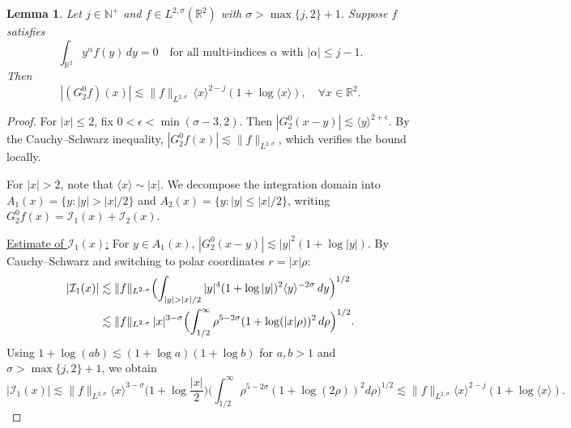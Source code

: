 \documentclass[reqno]{amsart}
\newtheorem{lemma}[theorem]{Lemma}
\numberwithin{equation}{section}
\begin{document}
\begin{lemma} \label{estimate_G_2^0}
	Let $j \in \mathbb{N}^+$ and $f \in L^{2,\sigma}(\mathbb{R}^2)$ with $\sigma > \max\{j, 2\} + 1$. Suppose $f$ satisfies 
\begin{equation}\label{eq:cancellation}
		\int_{\mathbb{R}^2} y^\alpha f(y) \, dy = 0 \quad \text{for all multi-indices } \alpha \text{ with } |\alpha| \le j-1.
	\end{equation}
	Then 
	\[
	\left| (G_2^0f)(x) \right| \lesssim \|f\|_{L^{2,\sigma}} \, \langle x \rangle^{2-j} (1 + \log \langle x \rangle), \quad \forall x \in \mathbb{R}^2.
	\]
\end{lemma}

\begin{proof}
	For $|x| \le 2$, fix $0<\epsilon< \min(\sigma-3, 2)$. Then $|G_2^0(x-y)|\lesssim \langle y \rangle^{2+\epsilon}$. By the Cauchy--Schwarz inequality, $|G_2^0 f(x)|\lesssim \|f\|_{L^{2,\sigma}}$, which verifies the bound locally.
	
	For $|x| > 2$, note that $\langle x \rangle \sim |x|$. We decompose the integration domain into $A_1(x) = \{ y : |y| > |x|/2 \}$ and $A_2(x) = \{ y : |y| \le |x|/2 \}$, writing $G_2^0f(x) =\mathcal {I}_1(x) + \mathcal {I}_2(x)$.
	
	\underline{Estimate of $\mathcal{I}_1(x)$:} For $y \in A_1(x)$, $|G_2^0(x-y)| \lesssim |y|^2 (1 + \log |y|)$. By Cauchy--Schwarz and switching to polar coordinates $r = |x|\rho$:
	\begin{align*}
		|\mathcal{I}_1(x)| &\lesssim \|f\|_{L^{2,\sigma}} \Bigl( \int_{|y| > |x|/2} |y|^4 (1 + \log |y|)^2 \langle y \rangle^{-2\sigma} \, dy \Bigr)^{1/2} \\
		&\lesssim \|f\|_{L^{2,\sigma}} \, |x|^{3-\sigma} \Bigl( \int_{1/2}^\infty \rho^{5-2\sigma} (1 + \log(|x|\rho))^2 \, d\rho \Bigr)^{1/2}.
	\end{align*}
	Using $1 + \log(ab) \lesssim (1 + \log a)(1 + \log b)$ for $a,b>1$ and $\sigma > \max\{j, 2\} + 1$,  we obtain
 	\[
	|\mathcal{I}_1(x)| \lesssim \|f\|_{L^{2,\sigma}} \langle x \rangle^{3-\sigma} \Big(1 + \log \frac{|x|}{2}\Big) \Big( \int_{1/2}^\infty \rho^{5-2\sigma} (1 + \log (2\rho))^2 d\rho \Big)^{1/2} \lesssim \|f\|_{L^{2,\sigma}}  \langle x\rangle^{2-j} (1 + \log \langle x\rangle).
	\]
 


\end{proof}
\end{document}
